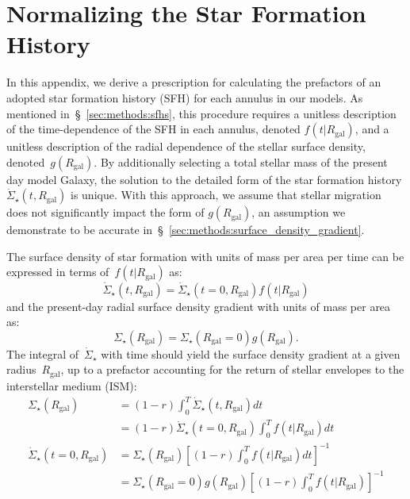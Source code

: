 \documentclass[draft2.tex]{subfiles}
\begin{document}
 

\section{Normalizing the Star Formation History} 
\label{sec:normalize_sfh} 

In this appendix, we derive a prescription for calculating the prefactors of an 
adopted star formation history (SFH) for each annulus in our models. As 
mentioned in~\S~\ref{sec:methods:sfhs}, this procedure requires a unitless 
description of the time-dependence of the SFH in each annulus, denoted 
$f(t|R_\text{gal})$, and a unitless description of the radial dependence 
of the stellar surface density, denoted~$g(R_\text{gal})$. 
By additionally selecting a 
total stellar mass of the present day model Galaxy, the solution to the 
detailed form of the star formation history 
$\dot{\Sigma}_\star(t, R_\text{gal})$ is unique. With this approach, we assume 
that stellar migration does not significantly impact the form of 
$g(R_\text{gal})$, an assumption we demonstrate to be accurate 
in~\S~\ref{sec:methods:surface_density_gradient}. 
\par 
The surface density of star formation with units of mass per area per time can 
be expressed in terms of~$f(t|R_\text{gal})$ as: 
\begin{equation} 
\dot{\Sigma}_\star(t, R_\text{gal}) = \dot{\Sigma}_\star(t = 0, R_\text{gal}) 
f(t|R_\text{gal}) 
\label{eq:sfh_terms_of_f} 
\end{equation} 
and the present-day radial surface density gradient with units of mass per area 
as: 
\begin{equation} 
\Sigma_\star(R_\text{gal}) = \Sigma_\star(R_\text{gal} = 0) g(R_\text{gal}). 
\label{eq:sigma_terms_of_g}  
\end{equation} 
The integral of~$\dot{\Sigma}_\star$ with time should yield the surface density 
gradient at a given radius~$R_\text{gal}$, up to a prefactor accounting for the 
return of stellar envelopes to the interstellar medium (ISM): 
\begin{subequations}\begin{align} 
\Sigma_\star(R_\text{gal}) &= (1 - r)\int_0^T \dot{\Sigma}_\star(t, 
R_\text{gal}) dt 
\\ 
&= (1 - r) \dot{\Sigma}_\star(t = 0, R_\text{gal})\int_0^T f(t|R_\text{gal}) dt 
\\ 
\dot{\Sigma}_\star(t = 0, R_\text{gal}) &= \Sigma_\star(R_\text{gal}) 
\left[(1 - r) \int_0^T f(t|R_\text{gal})dt\right]^{-1} 
\\ 
&= \Sigma_\star(R_\text{gal} = 0)g(R_\text{gal}) \left[(1 - r) \int_0^T 
f(t|R_\text{gal})\right]^{-1} 
\label{eq:intermediate_1} 
\end{align}\end{subequations} 
\end{document}
